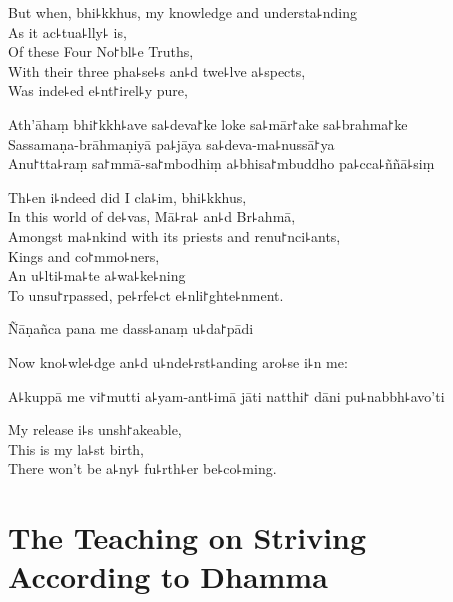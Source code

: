 \begin{english}
  But when, bhi꜕kkhus, my knowledge and understa꜕nding\\
  As it ac꜕tua꜕lly꜕ is,\\
  Of these Four No꜓bl꜕e Truths,\\
  With their three pha꜕se꜕s an꜕d twe꜕lve a꜕spects,\\
  Was inde꜕ed e꜕nt꜓irel꜕y pure,
\end{english}

Ath'āhaṃ bhi꜓kkh꜕ave sa꜕deva꜓ke loke sa꜕mār꜓ake sa꜕brahma꜓ke\\
Sassamaṇa-brāhmaṇiyā pa꜕jāya sa꜕deva-ma꜕nussā꜓ya\\
Anu꜓tta꜕raṃ sa꜓mmā-sa꜓mbodhiṃ a꜕bhisa꜓mbuddho pa꜕cca꜕ññā꜕siṃ

\begin{english}
  Th꜕en i꜕ndeed did I cla꜕im, bhi꜕kkhus,\\
  In this world of de꜕vas, Mā꜕ra꜕ an꜕d Br꜕ahmā,\\
  Amongst ma꜕nkind with its priests and renu꜓nci꜕ants,\\
  Kings and co꜓mmo꜕ners,\\
  An u꜕lti꜕ma꜕te a꜕wa꜕ke꜕ning\\
  To unsu꜓rpassed, pe꜕rfe꜕ct e꜕nli꜓ghte꜕nment.
\end{english}

Ñāṇañca pana me dass꜕anaṃ u꜕da꜓pādi

\begin{english}
  Now kno꜕wle꜕dge an꜕d u꜕nde꜕rst꜕anding aro꜕se i꜕n me:
\end{english}

\ifaivedition
\clearpage
\fi

A꜕kuppā me vi꜓mutti a꜕yam-ant꜕imā jāti natthi꜓ dāni pu꜕nabbh꜕avo'ti

\begin{english}
  My release i꜕s unsh꜓akeable,\\
  This is my la꜕st birth,\\
  There won't be a꜕ny꜕ fu꜕rth꜕er be꜕co꜕ming.
\end{english}

\chapter[Striving According to Dhamma]{The Teaching on Striving According to Dhamma}%


\begin{leader}
\end{leader}

